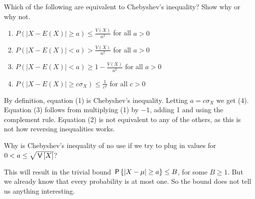 \documentclass[assignments]{subfiles}
\begin{document}
\begin{exercise}
Which of the following are equivalent to Chebyshev's inequality? Show why or why not.
\begin{enumerate}
    \item $P(\left|X-E\left(X\right)\right| \geq a) \leq \frac{V(X)}{a^2}$ for all $a>0$
    \item $P(\left|X-E\left(X\right)\right| < a) > \frac{V(X)}{a^2}$ for all $a>0$
    \item $P(\left|X-E\left(X\right)\right| < a) \geq 1-\frac{V(X)}{a^2}$ for all $a>0$
    \item $P(\left|X-E\left(X\right)\right| \geq c\sigma_X) \leq \frac{1}{c^2}$ for all $c>0$
\end{enumerate}

\begin{solution}
By definition, equation (1) is Chebyshev's inequality. Letting $a=c\sigma_X$ we get (4). Equation (3) follows from multiplying (1) by $-1$, adding 1 and using the complement rule. Equation (2) is not equivalent to any of the others, as this is not how reversing inequalities works.
\end{solution}
\end{exercise}

\begin{exercise}
Why is Chebyshev's inequality of no use if we try to plug in values for $0<a\leq \sqrt{\V{X}}$?

\begin{solution}
This will result in the trivial bound $\P{|X - \mu| \geq a}\leq B$, for some $B\geq 1$. But we already know that every probability is at most one. So the bound does not tell us anything interesting.
\end{solution}
\end{exercise}
\end{document}
